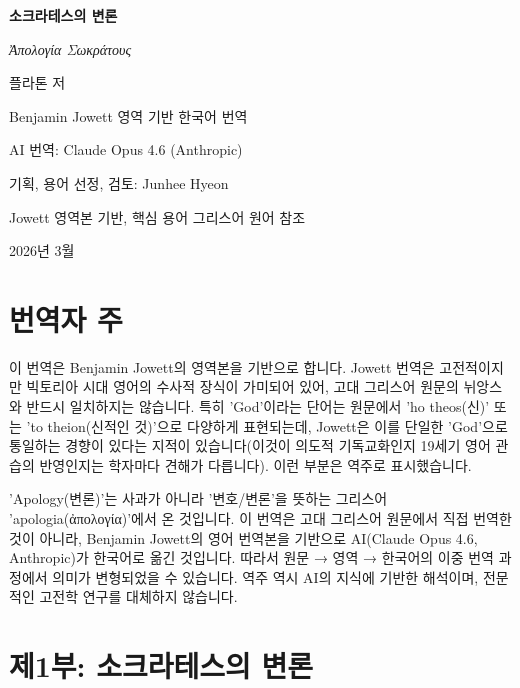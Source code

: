\documentclass[11pt, a4paper]{article}
\begin{document}
\begin{titlepage}
\centering
\vspace*{5cm}
{\Huge\bfseries 소크라테스의 변론\par}
\vspace{0.5cm}
{\Large\textit{Ἀπολογία Σωκράτους}\par}
\vspace{2cm}
{\Large 플라톤 저\par}
\vspace{0.5cm}
{\normalsize Benjamin Jowett 영역 기반 한국어 번역\par}
\vspace{1cm}
{\small AI 번역: Claude Opus 4.6 (Anthropic)\par}
{\small 기획, 용어 선정, 검토: Junhee Hyeon\par}
\vspace{0.5cm}
{\small Jowett 영역본 기반, 핵심 용어 그리스어 원어 참조\par}
\vfill
{\small 2026년 3월\par}
\end{titlepage}

\tableofcontents
\newpage

\section*{번역자 주}


이 번역은 Benjamin Jowett의 영역본을 기반으로 합니다. Jowett 번역은 고전적이지만 빅토리아 시대 영어의 수사적 장식이 가미되어 있어, 고대 그리스어 원문의 뉘앙스와 반드시 일치하지는 않습니다. 특히 'God'이라는 단어는 원문에서 'ho theos(신)' 또는 'to theion(신적인 것)'으로 다양하게 표현되는데, Jowett은 이를 단일한 'God'으로 통일하는 경향이 있다는 지적이 있습니다(이것이 의도적 기독교화인지 19세기 영어 관습의 반영인지는 학자마다 견해가 다릅니다). 이런 부분은 역주로 표시했습니다.


'Apology(변론)'는 사과가 아니라 '변호/변론'을 뜻하는 그리스어 'apologia(ἀπολογία)'에서 온 것입니다. 이 번역은 고대 그리스어 원문에서 직접 번역한 것이 아니라, Benjamin Jowett의 영어 번역본을 기반으로 AI(Claude Opus 4.6, Anthropic)가 한국어로 옮긴 것입니다. 따라서 원문 → 영역 → 한국어의 이중 번역 과정에서 의미가 변형되었을 수 있습니다. 역주 역시 AI의 지식에 기반한 해석이며, 전문적인 고전학 연구를 대체하지 않습니다.


\bigskip


\newpage
\section{제1부: 소크라테스의 변론}
\end{document}
